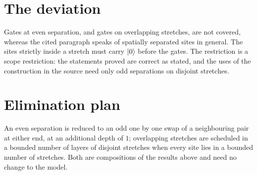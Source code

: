 \documentclass{article}
\begin{document}
\section{The deviation}
Gates at even separation, and gates on overlapping stretches, are not covered,
whereas the cited paragraph speaks of spatially separated sites in general.
The sites strictly inside a stretch must carry $|0\rangle$ before the gates. The
restriction is a scope restriction: the statements proved are correct as
stated, and the uses of the construction in the source need only odd
separations on disjoint stretches.

\section{Elimination plan}
An even separation is reduced to an odd one by one swap of a neighbouring pair
at either end, at an additional depth of $1$; overlapping stretches are
scheduled in a bounded number of layers of disjoint stretches when every site
lies in a bounded number of stretches. Both are compositions of the results
above and need no change to the model.



\end{document}
